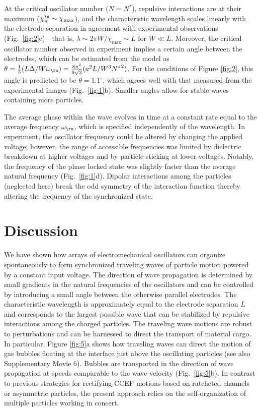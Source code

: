 At the critical oscillator number ($N = N^*$), repulsive interactions are at their maximum ($\chi^{\s}_n \sim \chi_{\max}$), and the characteristic wavelength scales linearly with the electrode separation in agreement with experimental observations (Fig.~\ref{fig:2}e)---that is, $\lambda\sim2\pi W/ \chi_{\max} \sim L$ for $W\ll L$.  Moreover, the critical oscillator number observed in experiment implies a certain angle between the electrodes, which can be estimated from the model as $\theta = \tfrac{1}{3}(L\Delta /W \omega_{\ro} ) = \tfrac{8 \pi ^2}{9 \sqrt{3}} (a^2 L/W^3 {N^*}^2)$. For the conditions of Figure \ref{fig:2}, this angle is predicted to be $\theta = 1.1^\circ$, which agrees well with that measured from the experimental images (Fig.~\ref{fig:1}b).  Smaller angles allow for stable waves containing more particles. 

The average phase within the wave evolves in time at a constant rate equal to the average frequency $\omega_{\ro}$, which is specified independently of the wavelength. In experiment, the oscillator frequency could be altered by changing the applied voltage; however, the range of accessible frequencies was limited by dielectric breakdown at higher voltages and by particle sticking at lower voltages\autocite{drews2015contact}. Notably, the frequency of the phase locked state was slightly faster than the average natural frequency (Fig.~\ref{fig:1}d). Dipolar interactions among the particles (neglected here) break the odd symmetry of the interaction function thereby altering the frequency of the synchronized state.


\section{Discussion}

We have shown how arrays of electromechanical oscillators can organize spontaneously to form synchronized traveling waves of particle motion powered by a constant input voltage.  The direction of wave propagation is determined by small gradients in the natural frequencies of the oscillators and can be controlled by introducing a small angle between the otherwise parallel electrodes.  The characteristic wavelength is approximately equal to the electrode separation $L$ and corresponds to the largest possible wave that can be stabilized by repulsive interactions among the charged particles.  The traveling wave motions are robust to perturbations and can be harnessed to direct the transport of material cargo.  In particular, Figure \ref{fig:5}a shows how traveling waves can direct the motion of gas bubbles floating at the interface just above the oscillating particles (see also Supplementary Movie 6).  Bubbles are transported in the direction of wave propagation at speeds comparable to the wave velocity (Fig.~\ref{fig:5}b). In contrast to previous strategies for rectifying CCEP motions based on ratcheted channels\autocite{drews2013ratcheted} or asymmetric particles\autocite{Dou2016}, the present approach relies on the self-organization of multiple particles working in concert. 

